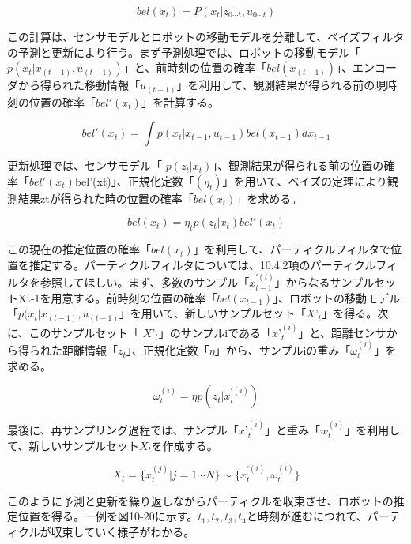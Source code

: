  \begin{equation}
   bel(x_t) = P(x_t|z_{0\cdots t},u_{0\cdots t})
 \end{equation}

この計算は、センサモデルとロボットの移動モデルを分離して、ベイズフィルタの予測と更新により行う。まず予測処理では、ロボットの移動モデル「 $p( x_t | x_{(t-1)}, u_{(t-1)} )$」と、前時刻の位置の確率「$bel(x_{(t-1)})$」、エンコーダから得られた移動情報「$u_{(t-1)}$」を利用して、観測結果が得られる前の現時刻の位置の確率「$bel'(x_t)$」を計算する。

\begin{equation}
  bel'(x_t) = \int p(x_t | x_{t-1},u_{t-1})bel(x_{t-1})dx_{t-1}
\end{equation}

更新処理では、センサモデル「 $p( z_t | x_t )$」、観測結果が得られる前の位置の確率「$bel'(x_t)$bel'(xt)」、正規化定数「$(\eta_t)$」を用いて、ベイズの定理により観測結果ztが得られた時の位置の確率「$bel(x_t)$」を求める。

\begin{equation}
  bel(x_t) = \eta_t p(z_t|x_t)bel'(x_t)
\end{equation}

この現在の推定位置の確率「$bel(x_t)$」を利用して、パーティクルフィルタで位置を推定する。パーティクルフィルタについては、10.4.2項のパーティクルフィルタを参照してほしい。まず、多数のサンプル「$x_{t-1}^{\prime(i)}$」からなるサンプルセットXt-1を用意する。前時刻の位置の確率「$bel(x_{t-1})$」、ロボットの移動モデル「$p( x_t | x_{(t-1)}, u_{(t-1)}$」を用いて、新しいサンプルセット「${X’}_t$」を得る。次に、このサンプルセット「 $X{’}_t$」のサンプルiである「${x’}_t^{(i)}$」と、距離センサから得られた距離情報「$z_t$」、正規化定数「$\eta$」から、サンプルiの重み「$\omega_t^{(i)}$」を求める。

\begin{equation}
  \omega_t^{(i)} = \eta p(z_t|x_t^{\prime(i)})
\end{equation}

最後に、再サンプリング過程では、サンプル「${x’}_t^{(i)}$」と重み「$w_t^{(i)}$」を利用して、新しいサンプルセット$X_t$を作成する。

\begin{equation}
  X_t = \{x_t^{(j)} | j=1 \cdots N\} \sim \{x_t^{\prime(i)},\omega_t^{(i)}\}
\end{equation}

このように予測と更新を繰り返しながらパーティクルを収束させ、ロボットの推定位置を得る。一例を図10-20に示す。$t_1, t_2, t_3, t_4$と時刻が進むにつれて、パーティクルが収束していく様子がわかる。

